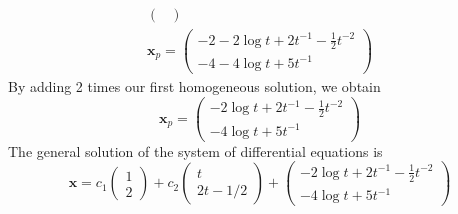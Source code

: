 \begin{Solution}
\begin{gather*}
\begin{pmatrix}
    \end{pmatrix} \\
    \mathbf{x}_p = 
    \begin{pmatrix}
      -2 - 2 \log t + 2 t^{-1} - \frac{1}{2} t^{-2} \\
      -4 - 4 \log t + 5 t^{-1}
    \end{pmatrix} 
  \end{gather*}
  By adding 2 times our first homogeneous solution, we obtain
  \[
  \mathbf{x}_p = 
  \begin{pmatrix}
    - 2 \log t + 2 t^{-1} - \frac{1}{2} t^{-2} \\
    - 4 \log t + 5 t^{-1}
  \end{pmatrix} 
  \]
  The general solution of the system of differential equations is
  \[
  \boxed{
    \mathbf{x} = 
    c_1
    \begin{pmatrix}
      1 \\
      2
    \end{pmatrix}  + 
    c_2 
    \begin{pmatrix}
      t \\
      2 t - 1/2
    \end{pmatrix} +
    \begin{pmatrix}
      - 2 \log t + 2 t^{-1} - \frac{1}{2} t^{-2} \\
      - 4 \log t + 5 t^{-1}
    \end{pmatrix} 
    }
  \]
\end{Solution}






